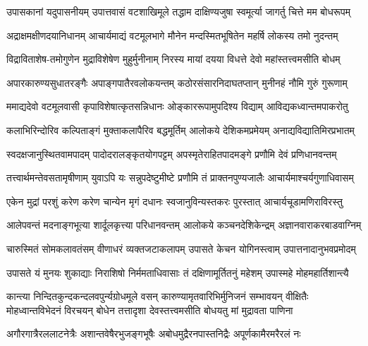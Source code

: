 
\fourlineindentedshloka
{उपासकानां यदुपासनीयम्}
{उपात्तवासं वटशाखिमूले}
{तद्धाम दाक्षिण्यजुषा स्वमूर्त्या}
{जागर्तु चित्ते मम बोधरूपम्}

\fourlineindentedshloka
{अद्राक्षमक्षीणदयानिधानम्}
{आचार्यमाद्यं वटमूलभागे}
{मौनेन मन्दस्मितभूषितेन}
{महर्षि लोकस्य तमो नुदन्तम्}

\fourlineindentedshloka
{विद्राविताशेष-तमोगुणेन}
{मुद्राविशेषेण मुहुर्मुनीनाम्}
{निरस्य मायां दयया विधत्ते}
{देवो महांस्तत्त्वमसीति बोधम्}

\fourlineindentedshloka
{अपारकारुण्यसुधातरङ्गैः}
{अपाङ्गपातैरवलोकयन्तम्}
{कठोरसंसारनिदाघतप्तान्}
{मुनीनहं नौमि गुरुं गुरूणाम्}

\fourlineindentedshloka
{ममाद्यदेवो वटमूलवासी}
{कृपाविशेषात्कृतसन्निधानः}
{ओङ्काररूपामुपदिश्य विद्याम्}
{आविद्यकध्वान्तमपाकरोतु}

\fourlineindentedshloka
{कलाभिरिन्दोरिव कल्पिताङ्गं}
{मुक्ताकलापैरिव बद्धमूर्तिम्}
{आलोकये देशिकमप्रमेयम्}
{अनाद्यविद्यातिमिरप्रभातम्}

\fourlineindentedshloka
{स्वदक्षजानुस्थितवामपादम्}
{पादोदरालङ्कृतयोगपट्टम्}
{अपस्मृतेराहितपादमङ्गे}
{प्रणौमि देवं प्रणिधानवन्तम्}

\fourlineindentedshloka
{तत्त्वार्थमन्तेवसतामृषीणाम्}
{युवाऽपि यः सन्नुपदेष्टुमीष्टे}
{प्रणौमि तं प्राक्तनपुण्यजालैः}
{आचार्यमाश्चर्यगुणाधिवासम्}

\fourlineindentedshloka
{एकेन मुद्रां परशुं करेण}
{करेण चान्येन मृगं दधानः}
{स्वजानुविन्यस्तकरः पुरस्तात्}
{आचार्यचूडामणिराविरस्तु}

\fourlineindentedshloka
{आलेपवन्तं मदनाङ्गभूत्या}
{शार्दूलकृत्त्या परिधानवन्तम्}
{आलोकये कञ्चनदेशिकेन्द्रम्}
{अज्ञानवाराकरबाडवाग्निम्}

\fourlineindentedshloka
{चारुस्मितं सोमकलावतंसम्}
{वीणाधरं व्यक्तजटाकलापम्}
{उपासते केचन योगिनस्त्वाम्}
{उपात्तनादानुभवप्रमोदम्}

\fourlineindentedshloka
{उपासते यं मुनयः शुकाद्याः}
{निराशिषो निर्ममताधिवासाः}
{तं दक्षिणामूर्तितनुं महेशम्}
{उपास्महे मोहमहार्तिशान्त्यै}

\fourlineindentedshloka
{कान्त्या निन्दितकुन्दकन्दलवपुर्न्यग्रोधमूले वसन्}
{कारुण्यामृतवारिभिर्मुनिजनं सम्भावयन् वीक्षितैः}
{मोहध्वान्तविभेदनं विरचयन् बोधेन तत्तादृशा}
{देवस्तत्त्वमसीति बोधयतु मां मुद्रावता पाणिना}

\fourlineindentedshloka
{अगौरगात्रैरललाटनेत्रैः}
{अशान्तवेषैरभुजङ्गभूषैः}
{अबोधमुद्रैरनपास्तनिद्रैः}
{अपूर्णकामैरमरैरलं नः}

